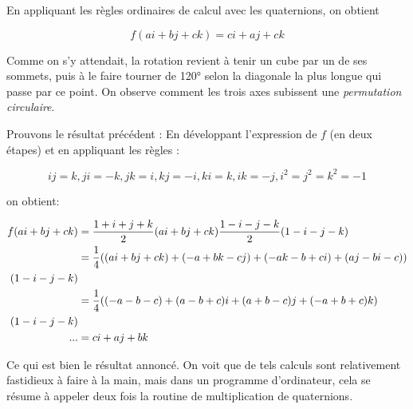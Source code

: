 En appliquant les règles ordinaires de calcul avec les quaternions, on obtient

\[
	f(ai+bj+ck) = ci + aj + ck
\]

Comme on s'y attendait, la rotation revient à tenir un cube par un de ses sommets, 
puis à le faire tourner de \ang{120} selon la diagonale la plus longue qui passe par ce point. On observe comment les trois axes subissent une \emph{permutation circulaire}.

\begin{dem}[title=Démonstration]{}{}
Prouvons le résultat précédent : 
En développant l'expression de $f$ (en deux étapes) et en appliquant les règles :

\[
	ij = k, ji = -k,
	jk=i, kj = -i,
	ki=k, ik=-j,
	i^2=j^2=k^2=-1
\]

on obtient:

\begin{align*}
	f(ai+bj+ck) &= \frac{1+i+j+k}{2}(ai+bj+ck)\frac{1-i-j-k}{2}
	(1 - i - j - k) \\
	&= \frac{1}{4}((ai+bj+ck)+(-a+bk-cj)+(-ak-b+ci)+(aj-bi-c)) \\
	(1 - i - j - k) \\
	&= \frac{1}{4} ((-a-b-c) + (a-b+c)i + (a+b-c)j + (-a+b+c)k) \\
	(1 - i - j - k)\\
	\text{...}
	&= ci + aj + bk
\end{align*}

Ce qui est bien le résultat annoncé. On voit que de tels calculs sont 
relativement fastidieux à faire à la main, mais dans un programme d'ordinateur, 
cela se résume à appeler deux fois la routine de multiplication de quaternions.

\end{dem}
